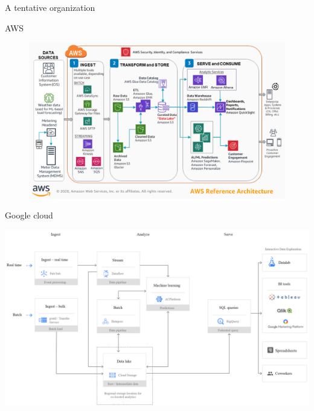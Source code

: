 \begin{frame}[allowframebreaks]{A tentative organization}


\framebreak

AWS

\begin{figure}
    \centering
    \includegraphics[height=.7\textheight]{imgs/awspipeline.png}
\end{figure}

\framebreak

Google cloud 

\includegraphics[height=.7\textheight]{imgs/gcpipeline.png}

\end{frame}


